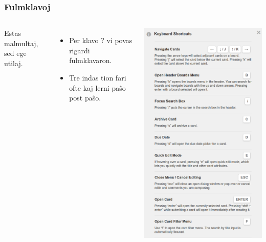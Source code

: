   \begin{frame}
    \frametitle{Fulmklavoj}
    	\begin{columns}
	
	Estas malmultaj, sed ege utilaj.
    
	\begin{itemize}
		\item Per klavo ? vi povas rigardi fulmklavaron.
		\item Tre indas tion fari ofte kaj lerni paŝo post paŝo.
	\end{itemize}
    
    	
    
    \includegraphics[scale=0.2]{ekranoj/fulmklavaro}
	
	\end{columns}
	
	
  \end{frame}




